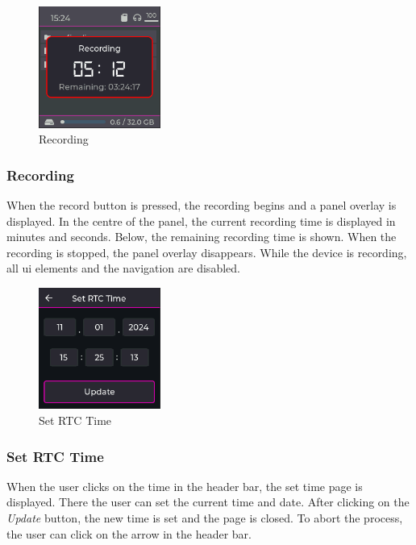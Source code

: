 \begin{minipage}{\linewidth}
	\begin{figure}
		\vspace{-0.6cm}
		\includegraphics[width=4cm]{images/4_design_acquisition_system/gui/04_recording.png}
		\centering
		\caption{Recording}
		\label{fig:acquisition_system_gui_recording}
	\end{figure}
	\subsubsection{Recording}
	When the record button is pressed, the recording begins and a panel overlay is displayed.
	In the centre of the panel, the current recording time is displayed in minutes and seconds.
	Below, the remaining recording time is shown.
	When the recording is stopped, the panel overlay disappears.
	While the device is recording, all \acrshort{ui} elements and the navigation are disabled.
\end{minipage}
\vspace{0.7cm}

\begin{minipage}{\linewidth}
	\begin{figure}
		\vspace{-0.6cm}
		\includegraphics[width=4cm]{images/4_design_acquisition_system/gui/05_set_time.png}
		\centering
		\caption{Set RTC Time}
		\label{fig:acquisition_system_gui_set_time}
	\end{figure}
	\subsubsection{Set RTC Time}
	When the user clicks on the time in the header bar, the set time page is displayed.
	There the user can set the current time and date.
	After clicking on the \textit{Update} button, the new time is set and the page is closed.
	To abort the process, the user can click on the arrow in the header bar.
\end{minipage}
\clearpage
